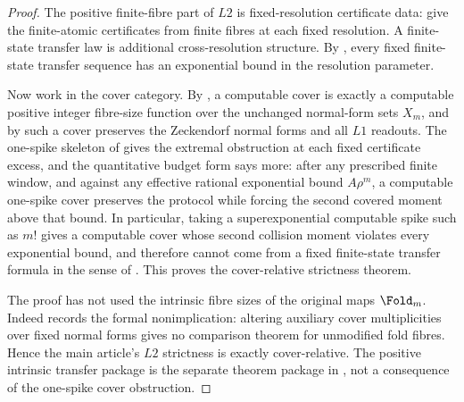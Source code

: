 \begin{proof}
The positive finite-fibre part of \(L2\) is fixed-resolution certificate data:
 give the
finite-atomic certificates from finite fibres at each fixed resolution.  A
finite-state transfer law is additional cross-resolution
structure.  By
,
every fixed finite-state transfer sequence has an exponential bound in the
resolution parameter.

Now work in the cover category.  By , a
computable cover is exactly a computable positive integer fibre-size function
over the unchanged normal-form sets \(X_m\), and by
 such a cover preserves the Zeckendorf normal
forms and all \(L1\) readouts.  The one-spike skeleton of
 gives the extremal obstruction at each
fixed certificate excess, and the quantitative budget form
 says more: after any prescribed
finite window, and against any effective rational exponential bound \(A\rho^m\), a
computable one-spike cover preserves the protocol while forcing the second
covered moment above that bound.  In particular, taking a superexponential
computable spike such as \(m!\) gives a computable cover whose second collision
moment violates every exponential bound, and therefore cannot come from a fixed
finite-state transfer formula in the sense of .
This proves the cover-relative strictness theorem.

The proof has not used the intrinsic fibre sizes of the original maps
\(\Fold_m\).  Indeed  records the
formal nonimplication: altering auxiliary cover multiplicities over fixed normal
forms gives no comparison theorem for unmodified fold fibres.  Hence the main
article's \(L2\) strictness is exactly cover-relative.  The positive intrinsic
transfer package is the separate theorem package in , not a
consequence of the one-spike cover obstruction.
\end{proof}

